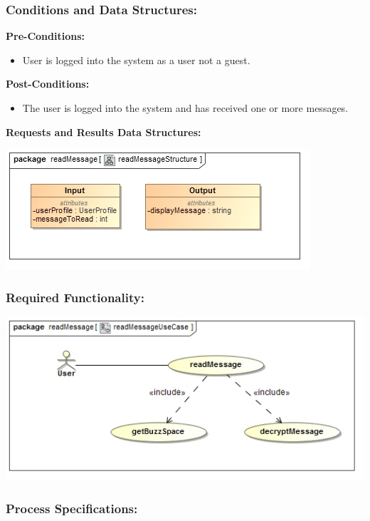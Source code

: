 \documentclass[a4paper,11pt]{article}
\begin{document}
\subsubsection{Conditions and Data Structures:}
\textbf{Pre-Conditions:}
\begin{itemize}
\item User is logged into the system as a user not a guest. 
\end{itemize}
\textbf{Post-Conditions:}
\begin{itemize}
\item The user is logged into the system and has received one or more messages.
\end{itemize}
\textbf{Requests and Results Data Structures:}
\begin{center}
\includegraphics[width=1\linewidth]{./Images/PrivateMessage/readMessageStructure}
\end{center}
\subsubsection{Required Functionality:} 
\includegraphics[width=1\linewidth]{./Images/PrivateMessage/readMessageUseCase}
\subsubsection{Process Specifications:} 
\end{document}
